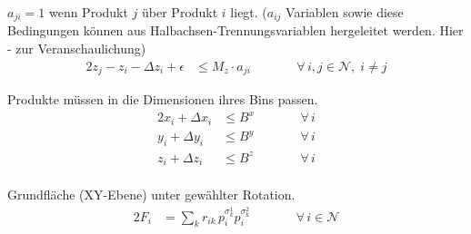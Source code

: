 \documentclass[10pt]{article}
\newcommand{\NN}{\mathcal{N}}
\begin{document}


$a_{ji} = 1$ wenn Produkt $j$ \"uber Produkt $i$ liegt. ($a_{ij}$ Variablen sowie diese Bedingungen k\"onnen aus Halbachsen-Trennungsvariablen hergeleitet werden. Hier - zur Veranschaulichung)
\begin{alignat*}{2}
z_j - z_i - \Delta z_i + \epsilon &\leq M_z \cdot a_{ji}
  &\qquad& \forall\, i,j \in \NN,\; i \neq j
\end{alignat*}

Produkte m\"ussen in die Dimensionen ihres Bins passen.
\begin{alignat*}{2}
x_i + \Delta x_i &\leq \textstyle B^x
  &\qquad& \forall\, i \\
y_i + \Delta y_i &\leq \textstyle B^y
  &\qquad& \forall\, i \\
z_i + \Delta z_i &\leq \textstyle B^z
  &\qquad& \forall\, i \\
\end{alignat*}

Grundfl\"ache (XY-Ebene) unter gew\"ahlter Rotation.
\begin{alignat*}{2}
F_i &= \textstyle\sum_k r_{ik}\, p_i^{\sigma_k^1} p_i^{\sigma_k^2}
  &\qquad& \forall\, i \in \NN
\end{alignat*}
\end{document}
